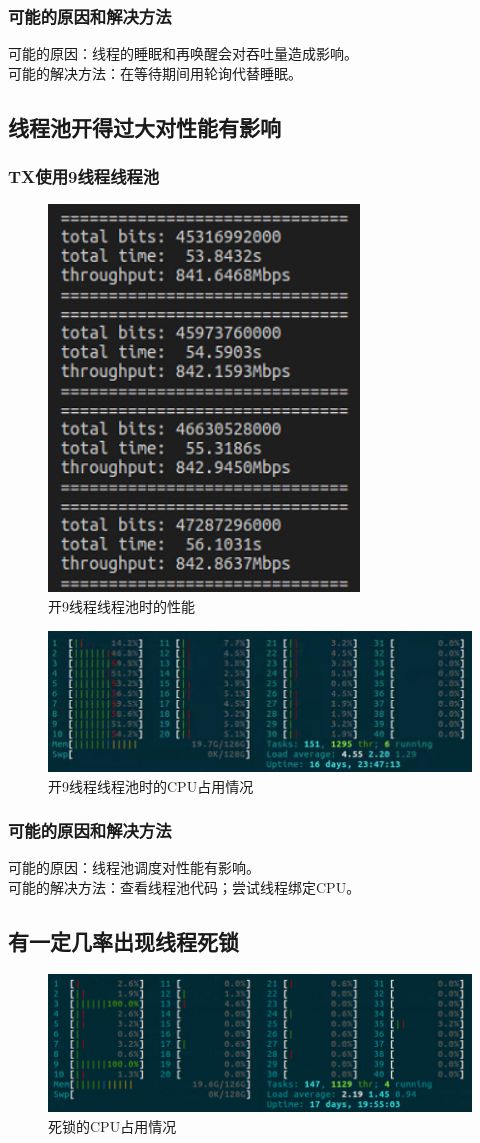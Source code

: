\documentclass{article}
\begin{document}
\subsubsection{可能的原因和解决方法}
可能的原因：线程的睡眠和再唤醒会对吞吐量造成影响。\\
可能的解决方法：在等待期间用轮询代替睡眠。

\subsection{线程池开得过大对性能有影响}
\subsubsection{TX使用9线程线程池}
\begin{figure}[H]
	\centering
	\includegraphics[width = .4\textwidth]{tx9.png}
	\caption{开9线程线程池时的性能}
\end{figure}
\begin{figure}[H]
	\centering
	\includegraphics[width = .8\textwidth]{cpu9.png}
	\caption{开9线程线程池时的CPU占用情况}
\end{figure}
\subsubsection{可能的原因和解决方法}
可能的原因：线程池调度对性能有影响。\\
可能的解决方法：查看线程池代码；尝试线程绑定CPU。

\subsection{有一定几率出现线程死锁}
\begin{figure}[H]
	\centering
	\includegraphics[width = .8\textwidth]{dead.png}
	\caption{死锁的CPU占用情况}
\end{figure}
\end{document}

